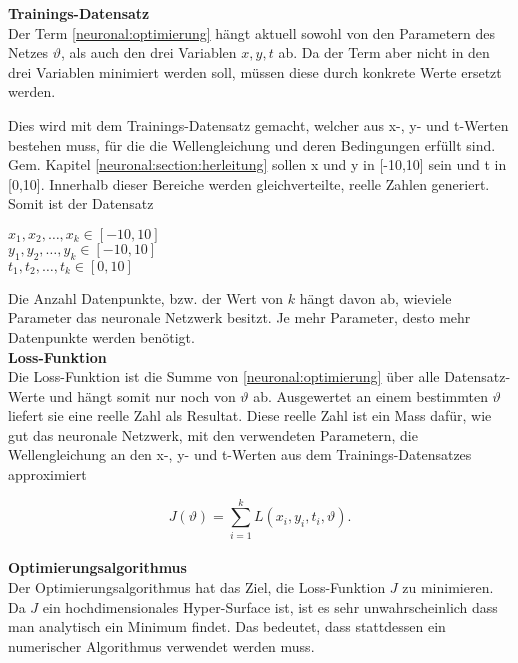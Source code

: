 \textbf{Trainings-Datensatz}\\
Der Term \eqref{neuronal:optimierung} hängt aktuell sowohl von den Parametern des Netzes \( \vartheta \), als auch den drei Variablen \( x, y, t \) ab.
Da der Term aber nicht in den drei Variablen minimiert werden soll, müssen diese durch konkrete Werte ersetzt werden.

Dies wird mit dem Trainings-Datensatz gemacht, welcher aus x-, y- und t-Werten bestehen muss, für die die Wellengleichung und deren Bedingungen erfüllt sind.
Gem. Kapitel \ref{neuronal:section:herleitung} sollen x und y in [-10,10] sein und t in [0,10].
Innerhalb dieser Bereiche werden gleichverteilte, reelle Zahlen generiert.
Somit ist der Datensatz
\begin{center}
    \( x_1, x_2, \ldots, x_k \in [-10,10] \)\\
    \( y_1, y_2, \ldots, y_k \in [-10,10] \)\\
    \( t_1, t_2, \ldots, t_k \in [0,10] \)\\
\end{center}

Die Anzahl Datenpunkte, bzw. der Wert von \( k \) hängt davon ab, wieviele Parameter das neuronale Netzwerk besitzt.
Je mehr Parameter, desto mehr Datenpunkte werden benötigt.\\


\textbf{Loss-Funktion}\\
Die Loss-Funktion ist die Summe von \eqref{neuronal:optimierung} über alle Datensatz-Werte und hängt somit nur noch von \( \vartheta \) ab. 
Ausgewertet an einem bestimmten \( \vartheta \) liefert sie eine reelle Zahl als Resultat.
Diese reelle Zahl ist ein Mass dafür, wie gut das neuronale Netzwerk, mit den verwendeten Parametern, die Wellengleichung an den x-, y- und t-Werten aus dem Trainings-Datensatzes approximiert

\begin{equation}
    J(\vartheta) = \sum_{i=1}^{k} L(x_i, y_i, t_i, \vartheta).
    \label{neuronal:loss}
\end{equation}\\

\textbf{Optimierungsalgorithmus}\\
Der Optimierungsalgorithmus hat das Ziel, die Loss-Funktion \( J \) zu minimieren.
Da \( J \) ein hochdimensionales Hyper-Surface ist, ist es sehr unwahrscheinlich dass man analytisch ein Minimum findet.
Das bedeutet, dass stattdessen ein numerischer Algorithmus verwendet werden muss.\\


